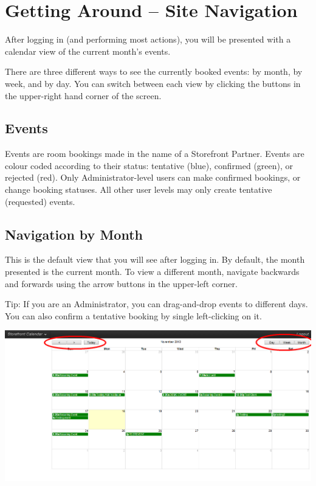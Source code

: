 \section{Getting Around -- Site Navigation}

After logging in (and performing most actions), you will be presented with a calendar view of the current month's events.

There are three different ways to see the currently booked events: by month, by week, and by day. You can switch between each view by clicking the buttons in the upper-right hand corner of the screen.


\subsection{Events}

Events are room bookings made in the name of a Storefront Partner. Events are colour coded according to their status: tentative (blue), confirmed (green), or rejected (red). Only Administrator-level users can make confirmed bookings, or change booking statuses. All other user levels may only create tentative (requested) events.


\subsection{Navigation by Month}

This is the default view that you will see after logging in. By default, the month presented is the current month. To view a different month, navigate backwards and forwards using the arrow buttons in the upper-left corner.

Tip: If you are an Administrator, you can drag-and-drop events to different days. You can also confirm a tentative booking by single left-clicking on it.

\includegraphics[width=\linewidth]{screenshots/img_month}

